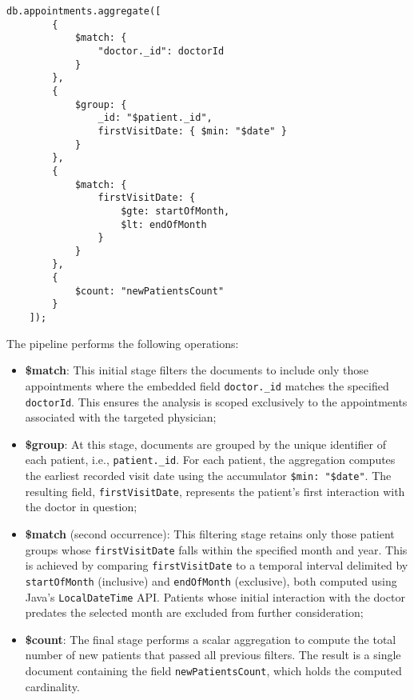 \begin{lstlisting}[language=mongodb, caption={Equivalent MongoDB Aggregation Pipeline for the New Patients of the Month analytic}]
	db.appointments.aggregate([
		{
			$match: {
				"doctor._id": doctorId
			}
		},
		{
			$group: {
				_id: "$patient._id",
				firstVisitDate: { $min: "$date" }
			}
		},
		{
			$match: {
				firstVisitDate: {
					$gte: startOfMonth,
					$lt: endOfMonth
				}
			}
		},
		{
			$count: "newPatientsCount"
		}
	]);
\end{lstlisting}

The pipeline performs the following operations:

\begin{itemize}
	\item \textbf{\$match}: This initial stage filters the documents to include only those appointments where the embedded field \texttt{doctor.\_id} matches the specified \texttt{doctorId}. This ensures the analysis is scoped exclusively to the appointments associated with the targeted physician;
		
	\item \textbf{\$group}: At this stage, documents are grouped by the unique identifier of each patient, i.e., \texttt{patient.\_id}. For each patient, the aggregation computes the earliest recorded visit date using the accumulator \texttt{\$min: "\$date"}. The resulting field, \texttt{firstVisitDate}, represents the patient's first interaction with the doctor in question;
		
	\item \textbf{\$match} (second occurrence): This filtering stage retains only those patient groups whose \texttt{firstVisitDate} falls within the specified month and year. This is achieved by comparing \texttt{firstVisitDate} to a temporal interval delimited by \texttt{startOfMonth} (inclusive) and \texttt{endOfMonth} (exclusive), both computed using Java's \texttt{LocalDateTime} API. Patients whose initial interaction with the doctor predates the selected month are excluded from further consideration;
	
	\item \textbf{\$count}: The final stage performs a scalar aggregation to compute the total number of new patients that passed all previous filters. The result is a single document containing the field \texttt{newPatientsCount}, which holds the computed cardinality.
	
\end{itemize}

